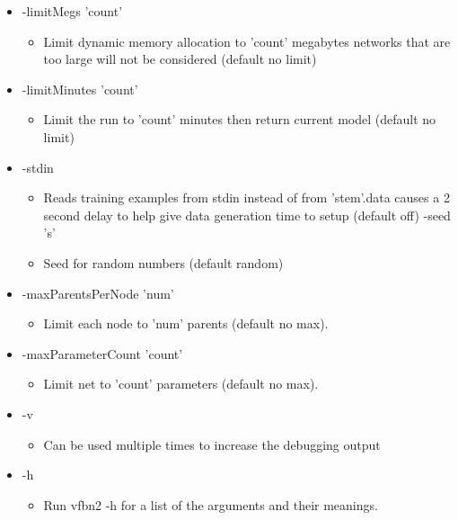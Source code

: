 \begin{itemize}
\item -limit\-Megs 'count'\begin{itemize}
\item Limit dynamic memory allocation to 'count' megabytes networks that are too large will not be considered (default no limit)\end{itemize}
\item -limit\-Minutes 'count'\begin{itemize}
\item Limit the run to 'count' minutes then return current model (default no limit)\end{itemize}
\item -stdin\begin{itemize}
\item Reads training examples from stdin instead of from 'stem'.data causes a 2 second delay to help give data generation time to setup (default off) -seed 's'\item Seed for random numbers (default random)\end{itemize}
\item -max\-Parents\-Per\-Node 'num'\begin{itemize}
\item Limit each node to 'num' parents (default no max).\end{itemize}
\item -max\-Parameter\-Count 'count'\begin{itemize}
\item Limit net to 'count' parameters (default no max).\end{itemize}
\item -v\begin{itemize}
\item Can be used multiple times to increase the debugging output\end{itemize}
\item -h\begin{itemize}
\item Run vfbn2 -h for a list of the arguments and their meanings.\end{itemize}
\end{itemize}


